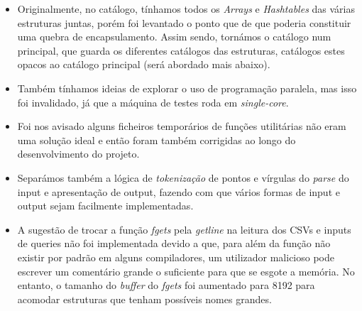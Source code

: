 \documentclass{article}
\begin{document}
            \begin{itemize}
                
                \item Originalmente, no catálogo, tínhamos todos os \textit{Arrays} e \textit{Hashtables} das 
                várias estruturas juntas, porém foi levantado o ponto que de que
                poderia constituir uma quebra de encapsulamento. Assim sendo, 
                tornámos o catálogo num principal, que guarda os diferentes
                catálogos das estruturas, catálogos estes opacos ao catálogo principal
                (será abordado mais abaixo).
                
                \item Também tínhamos ideias de explorar o uso de programação paralela,
                mas isso foi invalidado, já que a máquina de testes roda em \textit{single-core}.
    
                \item Foi nos avisado alguns ficheiros temporários de funções
                utilitárias não eram uma solução ideal e então foram também
                corrigidas ao longo do desenvolvimento do projeto.
    
                \item Separámos também a lógica de \textit{tokenização} de pontos e vírgulas
                do \textit{parse} do input e apresentação de output, fazendo com que
                vários formas de input e output sejam facilmente
                implementadas.
    
                \item A sugestão de trocar a função \textit{fgets} pela 
                \textit{getline} na leitura dos CSVs e inputs de queries 
                não foi implementada devido a que, para além da função não existir
                por padrão em alguns compiladores, um utilizador malicioso
                pode escrever um comentário grande o suficiente para que se 
                esgote a memória.
                No entanto, o tamanho do \textit{buffer} do \textit{fgets}
                foi aumentado para 8192 para acomodar estruturas
                que tenham possíveis nomes grandes.
                
            \end{itemize}
                        
\end{document}
